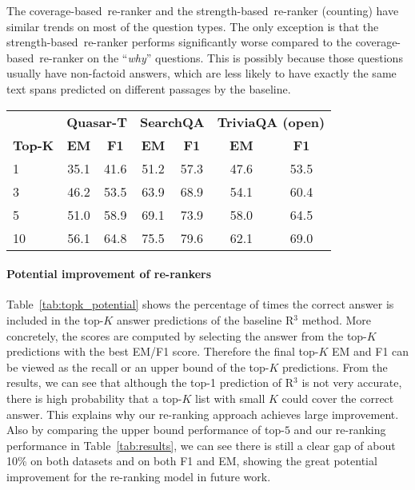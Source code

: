 \documentclass{article} \usepackage{iclr2018_conference,times}
\def \coherence {strength-based}
\def \union {coverage-based}
\begin{document}
The \union\ re-ranker and the \coherence\ re-ranker (counting) have similar trends on most of the question types. The only exception is that the \coherence\ re-ranker performs significantly worse compared to the \union\ re-ranker on the ``\emph{why}'' questions. This is possibly because those questions usually have non-factoid answers, which are less likely to have exactly the same text spans predicted on different passages by the baseline.

\begin{table*}[t]
\centering
\begin{tabular}{lcccccc}
\toprule
                  & \multicolumn{2}{c}{\bf Quasar-T} & \multicolumn{2}{c}{\bf SearchQA} & \multicolumn{2}{c}{\bf TriviaQA (open)}\\
    \bf Top-K             & \bf EM            & \bf F1            & \bf EM            & \bf F1 & \bf EM            & \bf F1 \\
\midrule
1  &  35.1 & 41.6 & 51.2 & 57.3 & 47.6 & 53.5 \\
3 & 46.2 & 53.5 & 63.9 & 68.9 & 54.1 & 60.4\\
5      & 51.0 & 58.9 & 69.1 & 73.9 & 58.0 & 64.5\\
10  & 56.1 & 64.8 & 75.5 & 79.6 & 62.1 & 69.0 \\
\bottomrule
\end{tabular}
\normalsize
\caption{The upper bound (recall) of the Top-K answer candidates generated by the baseline R$^3$ system (on dev set), which indicates the potential of the \union\ re-ranker.}
\label{tab:topk_potential}
\end{table*}

\paragraph{Potential improvement of re-rankers}
Table~\ref{tab:topk_potential} shows the percentage of times the correct answer is included in the top-$K$ answer predictions of the baseline R$^3$ method. 
More concretely, the scores are computed by selecting the answer from the top-$K$ predictions with the best EM/F1 score. Therefore the final top-$K$ EM and F1 can be viewed as the recall or an upper bound of the top-$K$ predictions. From the results, we can see that although the top-1 prediction of R$^3$ is not very accurate, there is high probability that a top-$K$ list with small $K$ could cover the correct answer. This explains why our re-ranking approach achieves large improvement. Also by comparing the upper bound performance of top-$5$ and our re-ranking performance in Table~\ref{tab:results}, we can see there is still a clear gap of about 10\% on both datasets and on both F1 and EM, showing the great potential improvement for the re-ranking model in future work.
\end{document}
